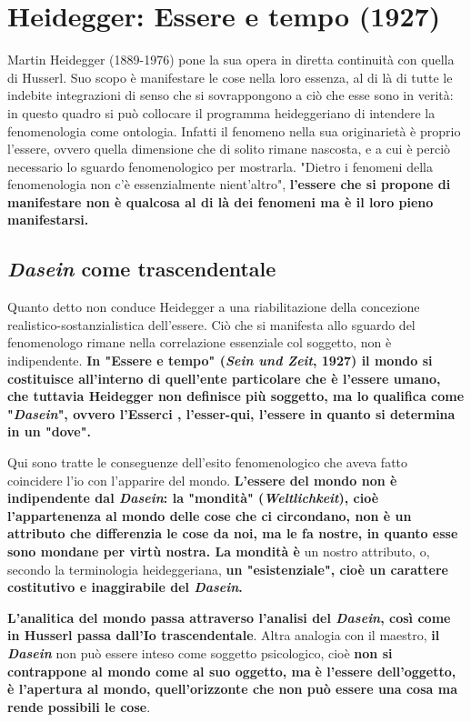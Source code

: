 \section{Heidegger: Essere e tempo (1927)}

Martin Heidegger (1889-1976) pone la sua opera in
diretta continuità con quella di Husserl. Suo scopo
è manifestare le cose nella loro essenza, al di là di
tutte le indebite integrazioni di senso che si sovrappongono a ciò che esse sono in verità: in questo quadro
si può collocare il programma heideggeriano di intendere
la fenomenologia come ontologia. Infatti il fenomeno
nella sua originarietà è proprio l'essere, ovvero quella dimensione
che di solito rimane nascosta, e a cui è perciò necessario
lo sguardo fenomenologico per mostrarla. "Dietro i
fenomeni della fenomenologia non c'è essenzialmente
nient'altro", \textbf{l'essere che si propone di manifestare non è
qualcosa al di là dei fenomeni ma è il loro pieno manifestarsi.}

\subsection{\textit{Dasein} come trascendentale}

Quanto detto non conduce Heidegger a una
riabilitazione della concezione realistico-sostanzialistica dell'essere. Ciò che si manifesta allo sguardo
del fenomenologo rimane nella correlazione
essenziale col soggetto, non è indipendente.
\textbf{In "Essere e tempo" (\textit{Sein und Zeit}, 1927) il mondo
si costituisce all'interno di quell'ente particolare che
è l'essere umano, che tuttavia Heidegger non
definisce più soggetto, ma lo qualifica come
"\textit{Dasein}", ovvero l'Esserci , l'esser-qui, l'essere in
quanto si determina in un "dove".}

Qui sono tratte le
conseguenze dell'esito fenomenologico che aveva fatto
coincidere l'io con l'apparire del mondo.
\textbf{L'essere del mondo non è indipendente dal \textit{Dasein}: la
"mondità" (\textit{Weltlichkeit}), cioè l'appartenenza al mondo
delle cose che ci circondano, non è un attributo che
differenzia le cose da noi, ma le fa nostre, in quanto
esse sono mondane per virtù nostra. La mondità è}
un nostro attributo, o, secondo la terminologia
heideggeriana, \textbf{un "esistenziale", cioè un carattere
costitutivo e inaggirabile del \textit{Dasein}.}


\textbf{L'analitica del mondo passa attraverso l'analisi del
\textit{Dasein}, così come in Husserl passa dall'Io
trascendentale}. Altra analogia con il maestro, \textbf{il
\textit{Dasein}} non può essere inteso come soggetto psicologico,
cioè  \textbf{non si contrappone al mondo come al suo oggetto,
ma} \textbf{è l'essere dell'oggetto, è l'apertura al mondo,
quell'orizzonte che non può essere una cosa ma
rende possibili le cose}.

